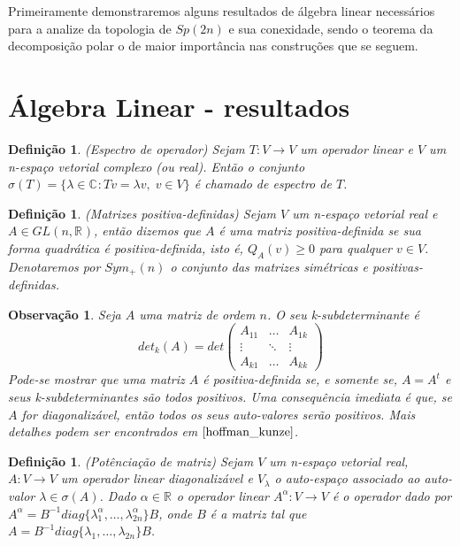 \documentclass[12pt]{book}
\newtheorem{definicao}[teorema]{Definição}
\newtheorem{observacao}[teorema]{Observação}
\newcommand{\complexo}[1]{\mathbb{C}^{#1}}
\newcommand{\generalgroup}[2]{GL(#1, #2)}
\newcommand{\generalgroupreal}[1]{\generalgroup{#1}{\real{}}}
\newcommand{\gruposimpletico}[1]{Sp(#1)}
\newcommand{\matrizsimetricapositiva}[1]{Sym_{+}(#1)}
\newcommand{\real}[1]{\mathbb{R}^{#1}}
\begin{document}
	Primeiramente demonstraremos alguns resultados de álgebra linear necessários para a analize da topologia de $\gruposimpletico{2n}$ e sua conexidade, sendo o teorema da decomposição polar o de maior importância nas construções que se seguem.
	
	\section{Álgebra Linear - resultados}
	\begin{definicao}\label{definicao_espectro_operador}
		(Espectro de operador) Sejam $T:V \to V$ um operador linear e $V$ um n-espaço vetorial complexo (ou real). Então o conjunto $\sigma(T)=\{\lambda\in \complexo{}: Tv = \lambda v, \; v \in V \}$ é chamado de espectro de $T$. 
	\end{definicao}
	
	\begin{definicao}\label{definicao_matriz_positiva_definida}
		(Matrizes positiva-definidas) Sejam $V$ um n-espaço vetorial real  e $A \in \generalgroupreal{n}$, então dizemos que $A$ é uma matriz positiva-definida se sua forma quadrática é positiva-definida, isto é, $Q_{A}(v)\ge 0$ para qualquer $v\in V$. Denotaremos por $\matrizsimetricapositiva{n}$ o conjunto das matrizes simétricas e positivas-definidas.
	\end{definicao}
	
	\begin{observacao}\label{observacao_matriz_positiva_definida}
		Seja $A$ uma matriz de ordem $n$. O seu k-subdeterminante é
		$$
		det_{k}(A) =
		det \left(
		\begin{array}{ccc}
		A_{11} & \dots & A_{1k}
		\\
		\vdots & \ddots & \vdots
		\\
		A_{k1} & \dots & A_{kk}
		\end{array}
		\right)
		$$
		Pode-se mostrar que uma matriz $A$ é positiva-definida se, e somente se, $A=A^{t}$ e seus k-subdeterminantes são todos positivos. Uma consequência imediata é que, se $A$ for diagonalizável, então todos os seus auto-valores serão positivos. Mais detalhes podem ser encontrados em $\cite{hoffman_kunze}$.
	\end{observacao}
	
	\begin{definicao}\label{definicao_potenciacao_matriz}
		(Potênciação de matriz) Sejam $V$ um n-espaço vetorial real, $A:V \to V$ um operador linear diagonalizável e $V_{\lambda}$ o auto-espaço associado ao auto-valor $\lambda \in \sigma(A)$. Dado $\alpha \in \real{}$ o operador linear $A^{\alpha}:V \to V$ é o operador dado por $A^{\alpha} = B^{-1}diag\{ \lambda_{1}^{\alpha} , \dots, \lambda_{2n}^{\alpha} \}B$, onde $B$ é a matriz tal que $A= B^{-1}diag\{ \lambda_{1}, \dots, \lambda_{2n}\}B$.
	\end{definicao}
	
\end{document}
